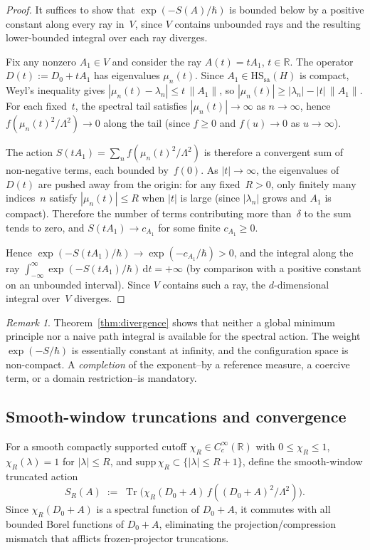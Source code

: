 \documentclass[12pt,a4paper]{article}
\theoremstyle{plain}
\theoremstyle{definition}
\theoremstyle{remark}
\newtheorem{remark}[theorem]{Remark}
\newcommand{\dd}{\mathrm{d}}
\newcommand{\Tr}{\operatorname{Tr}}
\newcommand{\HS}{\mathrm{HS}}
\newcommand{\sa}{\mathrm{sa}}
\newcommand{\R}{\mathbb{R}}
\newcommand{\Lam}{\Lambda}
\begin{document}
\begin{proof}
It suffices to show that $\exp(-S(A)/\hbar)$ is bounded below by a
positive constant along every ray in~$V$, since $V$ contains
unbounded rays and the resulting lower-bounded integral over each
ray diverges.

Fix any nonzero $A_1 \in V$ and consider the ray $A(t) = tA_1$,
$t \in \R$.  The operator $D(t) := D_0 + tA_1$ has eigenvalues
$\mu_n(t)$.  Since $A_1 \in \HS_\sa(H)$ is compact,
Weyl's inequality gives $|\mu_n(t) - \lambda_n| \le t\,\|A_1\|$,
so $|\mu_n(t)| \ge |\lambda_n| - |t|\,\|A_1\|$.  For each
fixed~$t$, the spectral tail satisfies $|\mu_n(t)| \to \infty$ as
$n \to \infty$, hence $f(\mu_n(t)^2/\Lam^2) \to 0$ along the tail
(since $f \ge 0$ and $f(u) \to 0$ as $u \to \infty$).

The action $S(tA_1) = \sum_n f(\mu_n(t)^2/\Lam^2)$ is therefore a
convergent sum of non-negative terms, each bounded by~$f(0)$.  As
$|t| \to \infty$, the eigenvalues of $D(t)$ are pushed away from
the origin: for any fixed~$R > 0$, only finitely many indices~$n$
satisfy $|\mu_n(t)| \le R$ when $|t|$ is large (since $|\lambda_n|$
grows and $A_1$ is compact).  Therefore the number of terms
contributing more than~$\delta$ to the sum tends to zero, and
$S(tA_1) \to c_{A_1}$ for some finite $c_{A_1} \ge 0$.

Hence $\exp(-S(tA_1)/\hbar) \to \exp(-c_{A_1}/\hbar) > 0$, and the
integral along the ray $\int_{-\infty}^\infty \exp(-S(tA_1)/\hbar)\,
\dd t = +\infty$ (by comparison with a positive constant on an
unbounded interval).  Since $V$ contains such a ray, the
$d$-dimensional integral over~$V$ diverges.
\end{proof}

\begin{remark}
Theorem~\ref{thm:divergence} shows that neither a global minimum
principle nor a naive path integral is available for the spectral
action.  The weight $\exp(-S/\hbar)$ is essentially constant at
infinity, and the configuration space is non-compact.
A \emph{completion} of the exponent--by a reference measure, a
coercive term, or a domain restriction--is mandatory.
\end{remark}

\subsection{Smooth-window truncations and convergence}
\label{subsec:smooth-window}

For a smooth compactly supported cutoff $\chi_R \in C_c^\infty(\R)$
with $0 \le \chi_R \le 1$, $\chi_R(\lambda) = 1$ for
$|\lambda| \le R$, and $\mathrm{supp}\,\chi_R \subset
\{|\lambda| \le R+1\}$, define the smooth-window truncated action
\begin{equation}\label{eq:smooth-window}
  S_R(A) \;:=\; \Tr\bigl(\chi_R(D_0+A)\,f((D_0+A)^2/\Lam^2)\bigr).
\end{equation}
Since $\chi_R(D_0+A)$ is a spectral function of $D_0+A$, it commutes
with all bounded Borel functions of $D_0+A$, eliminating the
projection/compression mismatch that afflicts frozen-projector
truncations.
\end{document}
